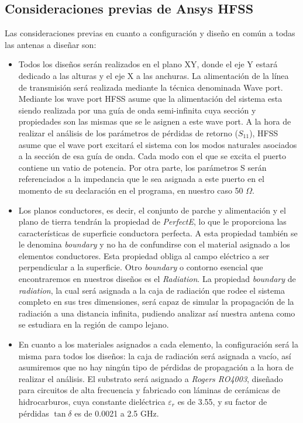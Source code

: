 \subsection{Consideraciones previas de Ansys HFSS}

\par Las consideraciones previas en cuanto a configuración y diseño en común a todas las antenas a diseñar son:

\begin{itemize}


\item Todos los diseños serán realizados en el plano XY, donde el eje Y estará dedicado a las alturas y el eje X a las anchuras. La alimentación de la línea de transmisión será realizada mediante la técnica denominada Wave port. Mediante los wave port HFSS asume que la alimentación del sistema esta siendo realizada por una guía de onda semi-infinita cuya sección y propiedades son las mismas que se le asignen a este wave port. A la hora de realizar el análisis de los parámetros de pérdidas de retorno ($S_{11}$), HFSS asume que el wave port excitará el sistema con los modos naturales asociados a la sección de esa guía de onda. Cada modo con el que se excita el puerto contiene un vatio de potencia. Por otra parte, los parámetros S serán referenciados a la impedancia que le sea asignada a este puerto en el momento de su declaración en el programa, en nuestro caso 50 $\Omega$.

\item Los planos conductores, es decir, el conjunto de parche y alimentación y el plano de tierra tendrán la propiedad de \textit{PerfectE}, lo que le proporciona las características de superficie conductora perfecta. A esta propiedad también se le denomina \textit{boundary} y no ha de confundirse con el material asignado a los elementos conductores. Esta propiedad obliga al campo eléctrico a ser perpendicular a la superficie. Otro \textit{boundary} o contorno esencial que encontraremos en nuestros diseños es el \textit{Radiation}. La propiedad \textit{boundary} de \textit{radiation}, la cual será asignada a la caja de radiación que rodee el sistema completo en sus tres dimensiones, será capaz de simular la propagación de la radiación a una distancia infinita, pudiendo analizar así nuestra antena como se estudiara en la región de campo lejano.

\item En cuanto a los materiales asignados a cada elemento, la configuración será la misma para todos los diseños: la caja de radiación será asignada a vacío, así asumiremos que no hay ningún tipo de pérdidas de propagación a la hora de realizar el análisis. El substrato será asignado a \textit{Rogers RO4003}, diseñado para circuitos de alta frecuencia y fabricado con láminas de cerámicas de hidrocarburos, cuya constante dieléctrica $\varepsilon_{r}$ es de 3.55, y su factor de pérdidas $\tan \delta$ es de 0.0021 a 2.5 GHz.

\end{itemize}

